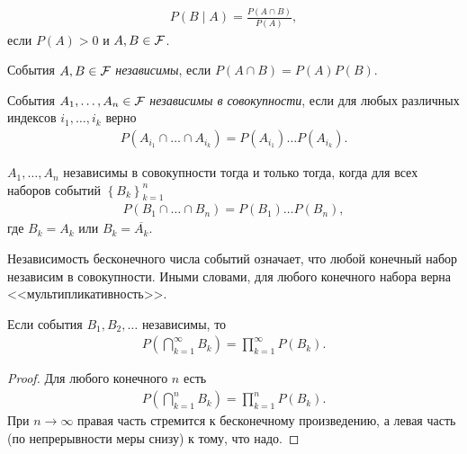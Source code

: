 \begin{df}
 \begin{align*}
  P(B \mid A) = \frac{P(A\cap B)}{P(A)},
 \end{align*} если $P(A) > 0$ и $A,B \in \mathcal F$.
\end{df}
\begin{df}
 События $A, B \in \mathcal F$ \textit{независимы}, если $P(A \cap B) = P(A) P(B)$.
\end{df}
\begin{df}
 События $A_1, \ldots, A_n \in \mathcal F$ \textit{независимы в совокупности}, если для любых различных индексов $i_1, \ldots, i_k$ верно
 \begin{align*}
  P(A_{i_1}\cap \ldots \cap A_{i_k}) = P(A_{i_1}) \ldots P(A_{i_k}).
 \end{align*} 
\end{df}
\begin{remrk}
 \label{remark:independed_complement}
 $A_1, \ldots, A_n$ независимы в совокупности тогда и только тогда, когда для всех наборов событий $\left\{ B_k \right\}_{k=1}^{n}$
 \begin{align*}
  P(B_1 \cap \ldots \cap B_n) = P(B_1) \ldots P(B_n),
 \end{align*} где $B_k = A_k$ или $B_k = \overline {A_k}$.
\end{remrk}
\begin{remrk*}
 Независимость бесконечного числа событий означает, что любой конечный набор независим в совокупности. Иными словами, для любого конечного набора верна <<мультипликативность>>.
\end{remrk*}
\begin{remrk}
 Если события $B_1, B_2, \ldots$  независимы, то
 \begin{align*}
  P \left( \bigcap_{k=1}^{\infty} B_k \right) = \prod_{k=1}^{\infty} P(B_k).
 \end{align*} 
\end{remrk}
\begin{proof}
 Для любого конечного $n$ есть
 \begin{align*}
  P \left( \bigcap_{k=1}^{n} B_k \right) = \prod_{k=1}^{n} P(B_k)
 .\end{align*} При $n \to \infty$ правая часть стремится к бесконечному произведению, а левая часть (по непрерывности меры снизу) к тому, что надо. 
\end{proof}
